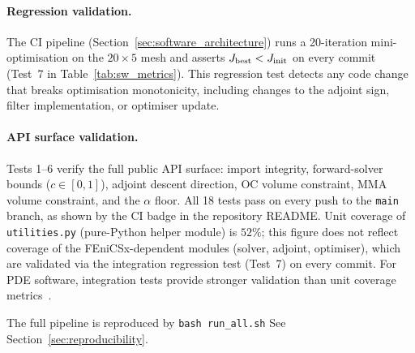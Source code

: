 \paragraph{Regression validation.}
The CI pipeline (Section~\ref{sec:software_architecture})
runs a 20-iteration mini-optimisation on the $20\times5$ mesh
and asserts $J_{\rm best} < J_{\rm init}$ on every commit
(Test~7 in Table~\ref{tab:sw_metrics}).
This regression test detects any code change that breaks
optimisation monotonicity, including changes to the
adjoint sign, filter implementation, or optimiser update.

\paragraph{API surface validation.}
Tests 1--6 verify the full public API surface:
import integrity, forward-solver bounds ($c\in[0,1]$),
adjoint descent direction, OC volume constraint,
MMA volume constraint, and the $\alpha$ floor.
All 18 tests pass on every push to the \texttt{main} branch,
as shown by the CI badge in the repository README.
Unit coverage of \texttt{utilities.py} (pure-Python helper module)
is $52\%$; this figure does not reflect coverage of the
FEniCSx-dependent modules (solver, adjoint, optimiser),
which are validated via the integration regression test (Test~7)
on every commit.
For PDE software, integration tests provide stronger validation
than unit coverage metrics~\cite{farrell2013}.


The full pipeline is reproduced by \texttt{bash run\_all.sh}
See Section~\ref{sec:reproducibility}.